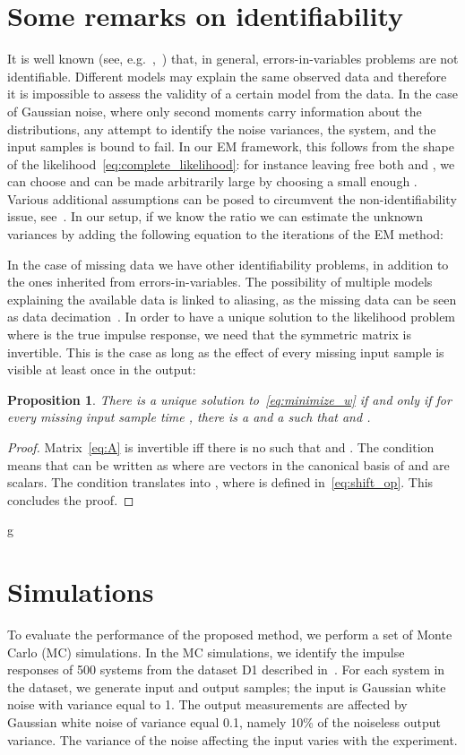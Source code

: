 \documentclass[10pt]{article}
\newtheorem{proposition}{Proposition}
\begin{document}
\section{Some remarks on identifiability}\label{sec:identifiability}
It is well known (see, e.g.~\cite{bottegal2011identifiability},~\cite{soederstroem2002perspectives}) that, in general,
errors-in-variables problems are not identifiable. Different
models may explain the same observed data and therefore it is impossible to
assess the validity of a certain model from the data. In the case of Gaussian
noise, where only
second moments carry information about the distributions, any attempt to
identify the noise variances, the system, and the input samples is bound to
fail.  In our EM framework, this follows from the shape of the likelihood~\eqref{eq:complete_likelihood}: for instance leaving free both  and
,  we can choose  and 
can be made arbitrarily large by choosing a small enough . Various
additional assumptions can be posed to circumvent the non-identifiability
issue, see~\cite{soederstroem2007errors}. In our setup, if we know the ratio
 we can estimate the unknown variances by
adding the following equation to the iterations of the EM method: 

In the case of missing data we have other identifiability problems, in
addition to the ones inherited from errors-in-variables. The possibility of
multiple models explaining the available data is linked to aliasing, as the
missing data can be seen as data decimation~\cite{wallin2002multiple}. In order
to have a unique solution to the likelihood problem
 where  is the true
  impulse response, we need that the symmetric matrix
   is invertible. This is the case as long as the effect of every
missing input sample is visible at least once in the output:
\begin{proposition}\label{prop:identifiability}
  There is a unique solution to~\eqref{eq:minimize_w} if and
  only if for every missing input sample time , there
  is a  and a  such that 
  and .  \end{proposition} \begin{proof} Matrix~\eqref{eq:A} is
  invertible iff there is no  such that  and
  . The condition  means that  can be
  written as  where  are vectors in
  the canonical basis of  and  are scalars. The condition
   translates into , where  is defined in~\eqref{eq:shift_op}. This concludes the
  proof.  \end{proof}
g
\section{Simulations}\label{sec:simulations}
To evaluate the performance of the proposed method, we perform a set of Monte
Carlo (MC) simulations. In the MC simulations, we identify the impulse
responses of 500 systems from the dataset D1 described in~\cite{chen2012sparse}.
For each system in the dataset, we generate  input and output
samples; the input is Gaussian white noise with variance equal to 1. The output
measurements are affected by Gaussian white noise of variance equal 0.1, namely
10\% of the noiseless output variance. The variance of the noise affecting the
input varies with the experiment.
\end{document}
